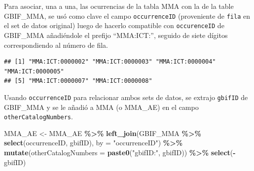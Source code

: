 \documentclass[sn-apa,pdflatex]{sn-jnl}
\newenvironment{Shaded}{\begin{snugshade}}{\end{snugshade}}
\newcommand{\AttributeTok}[1]{\textcolor[rgb]{0.13,0.29,0.53}{#1}}
\newcommand{\FunctionTok}[1]{\textcolor[rgb]{0.13,0.29,0.53}{\textbf{#1}}}
\newcommand{\NormalTok}[1]{#1}
\newcommand{\OtherTok}[1]{\textcolor[rgb]{0.56,0.35,0.01}{#1}}
\newcommand{\SpecialCharTok}[1]{\textcolor[rgb]{0.81,0.36,0.00}{\textbf{#1}}}
\newcommand{\StringTok}[1]{\textcolor[rgb]{0.31,0.60,0.02}{#1}}
\begin{document}
Para asociar, una a una, las ocurrencias de la tabla MMA con la de la
table GBIF\_MMA, se usó como clave el campo \texttt{occurrenceID}
(proveniente de \texttt{fila} en el set de datos original) luego de
hacerlo compatible con \texttt{occurenceID} de GBIF\_MMA añadiéndole el
prefijo ``MMA:ICT:'', seguido de siete dígitos correspondiendo al número
de fila.

\begin{Shaded}
\end{Shaded}

\begin{verbatim}
## [1] "MMA:ICT:0000002" "MMA:ICT:0000003" "MMA:ICT:0000004" "MMA:ICT:0000005"
## [5] "MMA:ICT:0000007" "MMA:ICT:0000008"
\end{verbatim}

Usando \texttt{occurrenceID} para relacionar ambos sets de datos, se
extrajo \texttt{gbifID} de GBIF\_MMA y se le añadió a MMA (o MMA\_AE) en
el campo \texttt{otherCatalogNumbers}.

\begin{Shaded}
\begin{Highlighting}[]
\NormalTok{MMA\_AE }\OtherTok{\textless{}{-}}\NormalTok{ MMA\_AE }\SpecialCharTok{\%\textgreater{}\%}
    \FunctionTok{left\_join}\NormalTok{(GBIF\_MMA }\SpecialCharTok{\%\textgreater{}\%}
        \FunctionTok{select}\NormalTok{(occurrenceID, gbifID), }\AttributeTok{by =} \StringTok{"occurrenceID"}\NormalTok{) }\SpecialCharTok{\%\textgreater{}\%}
    \FunctionTok{mutate}\NormalTok{(}\AttributeTok{otherCatalogNumbers =} \FunctionTok{paste0}\NormalTok{(}\StringTok{"gbifID:"}\NormalTok{, gbifID)) }\SpecialCharTok{\%\textgreater{}\%}
    \FunctionTok{select}\NormalTok{(}\SpecialCharTok{{-}}\NormalTok{gbifID)}
\end{Highlighting}
\end{Shaded}
\end{document}
